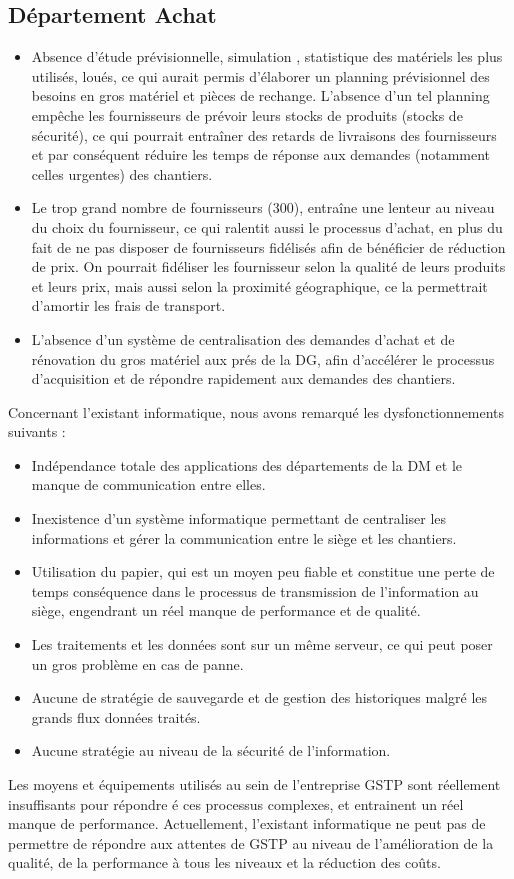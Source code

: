 		\subsection{Département Achat}
				\begin{itemize}
				    \item Absence d'étude prévisionnelle, simulation , statistique des matériels les plus utilisés, loués, ce qui aurait permis d'élaborer un planning prévisionnel des besoins en gros matériel et pièces de rechange. L'absence d'un tel planning empêche les fournisseurs de prévoir leurs stocks de produits (stocks de sécurité), ce qui pourrait entraîner des retards de livraisons des fournisseurs et par conséquent réduire les temps de réponse aux demandes (notamment celles urgentes) des chantiers.
						\item Le trop grand nombre de fournisseurs (300), entra\^ine une lenteur au niveau du choix du fournisseur, ce qui ralentit aussi le processus d'achat, en plus du fait de ne pas disposer de fournisseurs fidélisés afin de bénéficier de réduction de prix. On pourrait fidéliser les fournisseur selon la qualité de leurs produits et leurs prix, mais aussi selon la proximité géographique, ce la permettrait d'amortir les frais de transport.
						\item L'absence d'un système de centralisation des demandes d'achat et de rénovation du gros matériel aux prés de la DG, afin d'accélérer le processus d'acquisition et de répondre rapidement aux demandes des chantiers.
				\end{itemize}
		
		Concernant l'existant informatique, nous avons remarqué les dysfonctionnements suivants :
		\begin{itemize}
				\item Indépendance totale des applications des départements de la DM et le manque de communication entre elles.
				\item Inexistence d'un système informatique permettant de centraliser les informations et gérer la communication entre le siège et les chantiers.
				\item Utilisation du papier, qui est un moyen peu fiable et constitue une perte de temps conséquence dans le processus de transmission de l'information au siège, engendrant un réel manque de performance et de qualité.
				\item Les traitements et les données sont sur un même serveur, ce qui peut poser un gros problème en cas de panne.
				\item Aucune de stratégie de sauvegarde et de gestion des historiques malgré les grands flux données traités.
				\item Aucune stratégie au niveau de la sécurité de l'information.
		\end{itemize}

		Les moyens et équipements utilisés au sein de l'entreprise GSTP sont réellement insuffisants pour répondre é ces processus complexes, et entrainent un réel manque de performance. Actuellement, l'existant informatique ne peut pas de permettre de répondre aux attentes de
GSTP au niveau de l'amélioration de la qualité, de la performance à tous les niveaux et la réduction des coûts.
